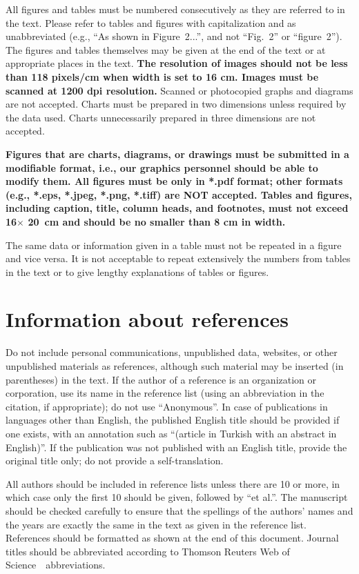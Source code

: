 \documentclass{article}
\begin{document}
All figures and tables must be numbered consecutively as they are referred to in the text. Please refer to tables and figures with capitalization and as unabbreviated (e.g., ``As shown in Figure~2...'', and not ``Fig.~2'' or ``figure~2''). The figures and tables themselves may be given at the end of the text or at appropriate places in the text. \textbf{The resolution of images should not be less than 118 pixels/cm when width is set to 16 cm. Images must be scanned at 1200 dpi resolution.} Scanned or photocopied graphs and diagrams are not accepted. Charts must be prepared in two dimensions unless required by the data used. Charts unnecessarily prepared in three dimensions are not accepted.

\textbf{Figures that are charts, diagrams, or drawings must be submitted in a modifiable format, i.e., our graphics personnel should be able to modify them. All figures must be only in *.pdf format; other formats (e.g., *.eps, *.jpeg, *.png, *.tiff) are NOT accepted. Tables and figures, including caption, title, column heads, and footnotes, must not exceed 16$\times$ 20~cm and should be no smaller than 8 cm in width.} 
 
The same data or information given in a table must not be repeated in a figure and vice versa. It is not acceptable to repeat extensively the numbers from tables in the text or to give lengthy explanations of tables or figures.

\section{Information about references}
Do not include personal communications, unpublished data, websites, or other unpublished materials as references, although such material may be inserted (in parentheses) in the text. If the author of a reference is an organization or corporation, use its name in the reference list (using an abbreviation in the citation, if appropriate); do not use ``Anonymous''. In case of publications in languages other than English, the published English title should be provided if one exists, with an annotation such as ``(article in Turkish with an abstract in English)''. If the publication was not published with an English title, provide the original title only; do not provide a self-translation.

All authors should be included in reference lists unless there are 10 or more, in which case only the first 10 should be given, followed by ``et al.''. The manuscript should be checked carefully to ensure that the spellings of the authors' names and the years are exactly the same in the text as given in the reference list. References should be formatted as shown at the end of this document. Journal titles should be abbreviated according to Thomson Reuters Web of Science~\textcopyright~abbreviations.
\end{document}
